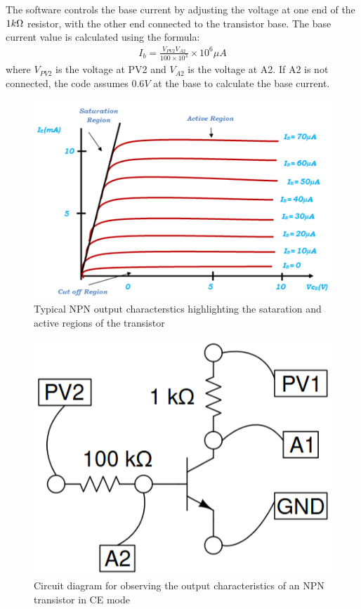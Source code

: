     The software controls the base current by adjusting the voltage at one end of the $1k\ohm$ resistor, with the other end connected to the transistor base. The base current value is calculated using the formula: \begin{align}I_b = \frac{V_{PV2}V_{A2}}{100 \times 10^3} \times 10^6 \mu A\end{align}where $V_{PV2}$ is the voltage at PV2 and $V_{A2}$ is the voltage at A2. If A2 is not connected, the code assumes $0.6 V$ at the base to calculate the base current.
    \begin{figure}[h]
        \centering
        \includegraphics[width=1\columnwidth]{images/trans.png}
        \caption{Typical NPN output characterstics highlighting the sataration and active regions of the transistor}
        \label{th:2}
    \end{figure}
    \begin{figure}[h]
        \centering
        \includegraphics[width=0.7\columnwidth]{images/trans2.png}
        \caption{Circuit diagram for observing the output characteristics of an NPN transistor in CE mode}
        \label{th:2.5}
    \end{figure}
